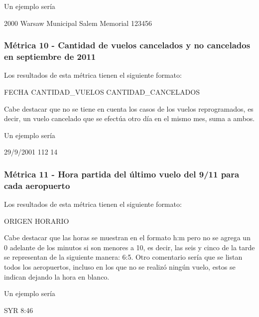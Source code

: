 \documentclass[a4paper,10pt]{article}
\begin{document}
            Un ejemplo sería\\
            \begin{center}
                2000  Warsaw Municipal  Salem Memorial  123456\\
            \end{center}

       \subsubsection{Métrica 10 - Cantidad de vuelos cancelados y no cancelados en septiembre de 2011}
            Los resultados de esta métrica tienen el siguiente formato:\\
            \begin{center}
                FECHA CANTIDAD\_VUELOS  CANTIDAD\_CANCELADOS
            \end{center}
            Cabe destacar que no se tiene en cuenta los casos de los vuelos reprogramados, es decir, un vuelo cancelado que se efectúa otro día en el mismo mes, suma a ambos.

            Un ejemplo sería\\
            \begin{center}
                29/9/2001  112  14\\
            \end{center}

       \subsubsection{Métrica 11 - Hora partida del último vuelo del 9/11 para cada aeropuerto}
            Los resultados de esta métrica tienen el siguiente formato:\\
            \begin{center}
                ORIGEN HORARIO
            \end{center}
            Cabe destacar que las horas se muestran en el formato h:m pero no se agrega un 0 adelante de los minutos si son menores a 10, es decir,
            las seis y cinco de la tarde se representan de la siguiente manera: 6:5. Otro comentario sería que se listan todos los aeropuertos, incluso
            en los que no se realizó ningún vuelo, estos se indican dejando la hora en blanco.

            Un ejemplo sería\\
            \begin{center}
                SYR  8:46\\
            \end{center}
\end{document}
